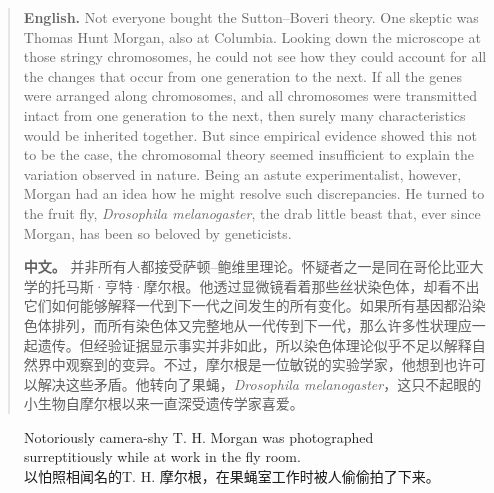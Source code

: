 \begin{quote}
\noindent\textbf{English.} Not everyone bought the Sutton--Boveri theory. One skeptic was Thomas Hunt Morgan, also at Columbia. Looking down the microscope at those stringy chromosomes, he could not see how they could account for all the changes that occur from one generation to the next. If all the genes were arranged along chromosomes, and all chromosomes were transmitted intact from one generation to the next, then surely many characteristics would be inherited together. But since empirical evidence showed this not to be the case, the chromosomal theory seemed insufficient to explain the variation observed in nature. Being an astute experimentalist, however, Morgan had an idea how he might resolve such discrepancies. He turned to the fruit fly, \emph{Drosophila melanogaster}, the drab little beast that, ever since Morgan, has been so beloved by geneticists.

\smallskip
\noindent\textbf{中文。} 并非所有人都接受萨顿--鲍维里理论。怀疑者之一是同在哥伦比亚大学的托马斯·亨特·摩尔根。他透过显微镜看着那些丝状染色体，却看不出它们如何能够解释一代到下一代之间发生的所有变化。如果所有基因都沿染色体排列，而所有染色体又完整地从一代传到下一代，那么许多性状理应一起遗传。但经验证据显示事实并非如此，所以染色体理论似乎不足以解释自然界中观察到的变异。不过，摩尔根是一位敏锐的实验学家，他想到也许可以解决这些矛盾。他转向了果蝇，\emph{Drosophila melanogaster}，这只不起眼的小生物自摩尔根以来一直深受遗传学家喜爱。
\end{quote}

\begin{figure}[htbp]
\centering
{}
\caption{Notoriously camera-shy T. H. Morgan was photographed surreptitiously while at work in the fly room.\\以怕照相闻名的T. H. 摩尔根，在果蝇室工作时被人偷偷拍了下来。}
\end{figure}

